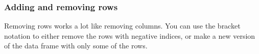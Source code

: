 \documentclass[
  13,
  letterpaper,
]{report}
\newenvironment{Shaded}{\begin{snugshade}}{\end{snugshade}}
\newcommand{\AttributeTok}[1]{\textcolor[rgb]{0.40,0.45,0.13}{#1}}
\newcommand{\CommentTok}[1]{\textcolor[rgb]{0.37,0.37,0.37}{#1}}
\newcommand{\ConstantTok}[1]{\textcolor[rgb]{0.56,0.35,0.01}{#1}}
\newcommand{\FunctionTok}[1]{\textcolor[rgb]{0.28,0.35,0.67}{#1}}
\newcommand{\NormalTok}[1]{\textcolor[rgb]{0.00,0.23,0.31}{#1}}
\newcommand{\SpecialCharTok}[1]{\textcolor[rgb]{0.37,0.37,0.37}{#1}}
\newcommand{\StringTok}[1]{\textcolor[rgb]{0.13,0.47,0.30}{#1}}
\begin{document}
\begin{Shaded}
\end{Shaded}

\subsubsection{Adding and removing rows}\label{sec-manip-df-com-add}

Removing rows works a lot like removing columns. You can use the bracket
notation to either remove the rows with negative indices, or make a new
version of the data frame with only some of the rows.
\end{document}
